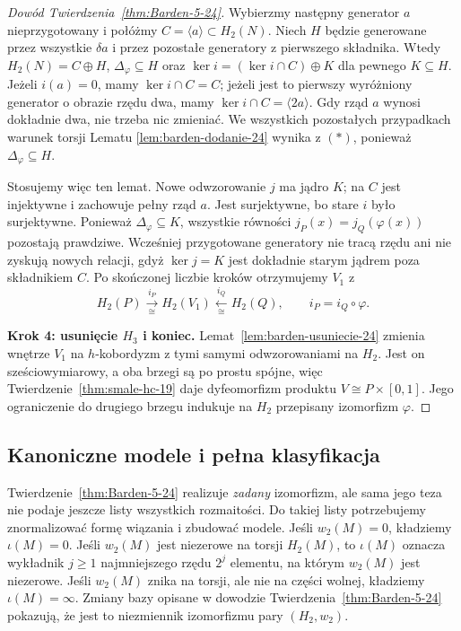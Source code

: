 \begin{proof}[Dowód Twierdzenia~\ref{thm:Barden-5-24}]
Wybierzmy następny generator $a$
nieprzygotowany i połóżmy
$C=\langle a\rangle\subset H_2(N)$.
Niech $H$ będzie generowane przez
wszystkie $\delta a$ i przez pozostałe
generatory z pierwszego składnika.
Wtedy $H_2(N)=C\oplus H$,
$\Delta_\varphi\subseteq H$ oraz
$\ker i=(\ker i\cap C)\oplus K$
dla pewnego $K\subseteq H$.
Jeżeli $i(a)=0$, mamy
$\ker i\cap C=C$; jeżeli jest to
pierwszy wyróżniony generator o
obrazie rzędu dwa, mamy
$\ker i\cap C=\langle2a\rangle$.
Gdy rząd $a$ wynosi dokładnie dwa,
nie trzeba nic zmieniać.
We wszystkich pozostałych przypadkach
warunek torsji Lematu
\ref{lem:barden-dodanie-24} wynika
z $(*)$, ponieważ $\Delta_\varphi
\subseteq H$.

Stosujemy więc ten lemat.
Nowe odwzorowanie $j$ ma jądro $K$;
na $C$ jest injektywne i zachowuje
pełny rząd $a$. Jest surjektywne,
bo stare $i$ było surjektywne.
Ponieważ $\Delta_\varphi\subseteq K$,
wszystkie równości
$j_P(x)=j_Q(\varphi(x))$ pozostają
prawdziwe. Wcześniej przygotowane
generatory nie tracą rzędu ani
nie zyskują nowych relacji,
gdyż $\ker j=K$ jest dokładnie
starym jądrem poza składnikiem $C$.
Po skończonej liczbie kroków
otrzymujemy $V_1$ z
\[
 H_2(P)\xrightarrow[\cong]{i_P}H_2(V_1)
 \xleftarrow[\cong]{i_Q}H_2(Q),
 \qquad i_P=i_Q\circ\varphi.
\]

\textbf{Krok 4: usunięcie $H_3$ i koniec.}
Lemat~\ref{lem:barden-usuniecie-24}
zmienia wnętrze $V_1$ na
$h$-kobordyzm z tymi samymi
odwzorowaniami na $H_2$.
Jest on sześciowymiarowy,
a oba brzegi są po prostu spójne,
więc Twierdzenie~\ref{thm:smale-hc-19}
daje dyfeomorfizm produktu
$V\cong P\times[0,1]$.
Jego ograniczenie do drugiego
brzegu indukuje na $H_2$
przepisany izomorfizm $\varphi$.
\end{proof}

\subsection*{Kanoniczne modele i pełna klasyfikacja}

Twierdzenie~\ref{thm:Barden-5-24}
realizuje \emph{zadany} izomorfizm,
ale sama jego teza nie podaje jeszcze
listy wszystkich rozmaitości.
Do takiej listy potrzebujemy znormalizować
formę wiązania i zbudować modele.
Jeśli $w_2(M)=0$, kładziemy $\iota(M)=0$.
Jeśli $w_2(M)$ jest niezerowe na torsji
$H_2(M)$, to $\iota(M)$ oznacza
wykładnik $j\geq1$ najmniejszego
rzędu $2^j$ elementu, na którym
$w_2(M)$ jest niezerowe.
Jeśli $w_2(M)$ znika na torsji,
ale nie na części wolnej,
kładziemy $\iota(M)=\infty$.
Zmiany bazy opisane w dowodzie
Twierdzenia~\ref{thm:Barden-5-24}
pokazują, że jest to niezmiennik
izomorfizmu pary $(H_2,w_2)$.

